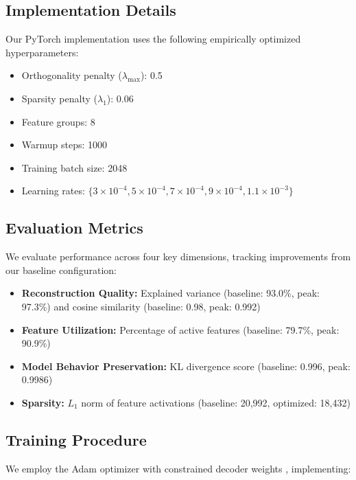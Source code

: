 \documentclass{article} %
\begin{document}
\subsection{Implementation Details}
Our PyTorch \cite{paszke2019pytorch} implementation uses the following empirically optimized hyperparameters:
\begin{itemize}
    \item Orthogonality penalty ($\lambda_{\text{max}}$): 0.5
    \item Sparsity penalty ($\lambda_1$): 0.06
    \item Feature groups: 8
    \item Warmup steps: 1000
    \item Training batch size: 2048
    \item Learning rates: $\{3 \times 10^{-4}, 5 \times 10^{-4}, 7 \times 10^{-4}, 9 \times 10^{-4}, 1.1 \times 10^{-3}\}$
\end{itemize}

\subsection{Evaluation Metrics}
We evaluate performance across four key dimensions, tracking improvements from our baseline configuration:

\begin{itemize}
    \item \textbf{Reconstruction Quality:} Explained variance (baseline: 93.0\%, peak: 97.3\%) and cosine similarity (baseline: 0.98, peak: 0.992)
    \item \textbf{Feature Utilization:} Percentage of active features (baseline: 79.7\%, peak: 90.9\%)
    \item \textbf{Model Behavior Preservation:} KL divergence score (baseline: 0.996, peak: 0.9986)
    \item \textbf{Sparsity:} $L_1$ norm of feature activations (baseline: 20,992, optimized: 18,432)
\end{itemize}

\subsection{Training Procedure}
We employ the Adam optimizer with constrained decoder weights \cite{rajamanoharanJumpingAheadImproving2024}, implementing:
\end{document}
